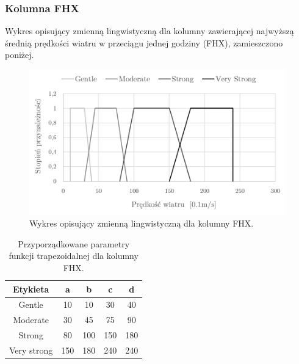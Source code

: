 \documentclass{classrep}
\begin{document}
\clearpage



\subsubsection{Kolumna FHX}
Wykres opisujący zmienną lingwistyczną dla kolumny zawierającej najwyższą średnią prędkości wiatru w przeciągu jednej godziny (FHX), zamieszczono poniżej.
\begin{figure}[H]
	\centering
	\includegraphics[width=0.99\textwidth]{Pictures/TermsCharts/FHX.png}
	\caption{Wykres opisujący zmienną lingwistyczną dla kolumny FHX.}
\end{figure}

\begin{table}[H]
	\centering
	\begin{tabular}{c c c c c} 
		\hline
		\textbf{Etykieta} & \textbf{a} & \textbf{b} & \textbf{c} & \textbf{d}\\ [0.5ex] 
		\hline
		\hline 
Gentle	 & 10 & 10 & 30 & 40 \\
Moderate & 30 & 45 & 75 & 90 \\
Strong	 & 80 & 100 & 150 & 180 \\
Very strong & 150 & 180 & 240 & 240 \\
		\hline
	\end{tabular}
	\caption{Przyporządkowane parametry funkcji trapezoidalnej dla kolumny FHX.}
\end{table}

\clearpage
\end{document}

